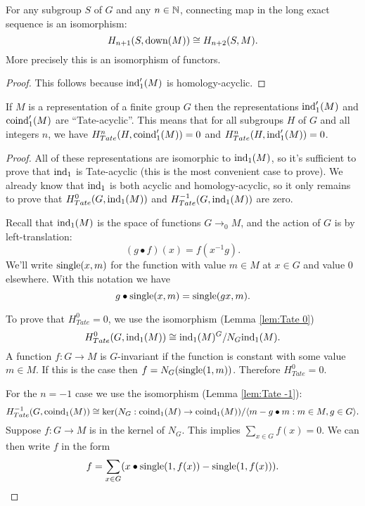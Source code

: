 \begin{lemma}	\label{lem:down iso}
	\leanok
	For any subgroup $S$ of $G$ and any $n \in {\mathbb N}$, connecting
	map in the long exact sequence is an isomorphism:
	\[
		H_{n+1}(S,\mathrm{down}(M)) \cong H_{n+2}(S,M).
	\]
	More precisely this is an isomorphism of functors.
\end{lemma}

\begin{proof}
	This follows because $\mathrm{ind}_1'(M)$ is homology-acyclic.
\end{proof}

\begin{lemma} \label{lem:ind₁' coind₁' Tate-acyclic}
	\leanok
	If $M$ is a representation of a finite group $G$ then the representations
	$\mathrm{ind}_1'(M)$ and $\mathrm{coind}_1'(M)$ are ``Tate-acyclic''.
	This means that for all
	subgroups $H$ of $G$ and all integers $n$, we have
	$H^n_{Tate}(H,\mathrm{coind}_1'(M)) = 0$ and $H^n_{Tate}(H,\mathrm{ind}_1'(M)) = 0$.
\end{lemma}

\begin{proof}
	All of these representations are isomorphic to $\mathrm{ind}_1(M)$, so it's
	sufficient to prove that $\mathrm{ind}_1$ is Tate-acyclic (this is the most convenient case to prove).
	We already know that $\mathrm{ind}_1$ is both acyclic and homology-acyclic, so it
	only remains to prove that $H^0_{Tate}(G,\mathrm{ind}_1(M))$ and $H^{-1}_{Tate}(G,\mathrm{ind}_1(M))$ are zero.

	Recall that $\mathrm{ind}_1(M)$ is the space of functions $G \to_0 M$, and the action of $G$ is by
	left-translation:
	\[
		(g \bullet f) (x) = f (x^{-1}g).
	\]
	We'll write $\mathrm{single}(x,m)$ for the function with value $m\in M$ at $x \in G$ and value $0$
	elsewhere. With this notation we have
	\[
		g \bullet \mathrm{single}(x,m) = \mathrm{single}(gx,m).
	\]

	To prove that $H^0_{Tate}=0$, we use the isomorphism (Lemma \ref{lem:Tate 0})
	\[
		H^0_{Tate}(G,\mathrm{ind}_1(M)) \cong \mathrm{ind}_1(M)^G / N_G \mathrm{ind}_1(M).
	\]
	A function $f : G \to M$ is $G$-invariant if the function is constant with some value $m \in M$.
	If this is the case then $f = N_G (\mathrm{single}(1,m))$. Therefore $H^0_{Tate} = 0$.

	For the $n=-1$ case we use the isomorphism (Lemma \ref{lem:Tate -1}):
	\[
		H^{-1}_{Tate}(G,\mathrm{coind}_1(M))
		\cong
		\ker(N_G : \mathrm{coind}_1(M) \to \mathrm{coind}_1(M)) / \langle m - g \bullet m : m \in M, g \in G \rangle.
	\]
	Suppose $f:G \to M$ is in the kernel of $N_G$.
	This implies $\sum_{x \in G} f(x) = 0$.
	We can then write $f$ in the form
	\[
		f = \sum_{x \in G} (x \bullet \mathrm{single}(1,f(x)) - \mathrm{single}(1,f(x))).
	\]
\end{proof}


